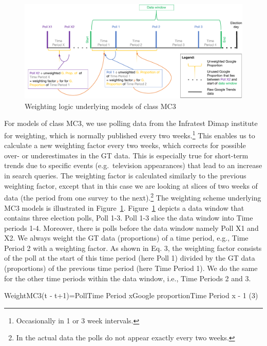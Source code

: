 \documentclass[
  letterpaper,
  DIV=11,
  numbers=noendperiod]{scrartcl}
\begin{document}
\begin{figure}[h]

\caption{\label{fig-3}Weighting logic underlying models of class MC3}

{\centering \includegraphics{Figure_3_weighting_logic.pdf}

}

\end{figure}

For models of class MC3, we use polling data from the Infratest Dimap
institute for weighting, which is normally published every two
weeks.\footnote{Occasionally in 1 or 3 week intervals.} This enables us
to calculate a new weighting factor every two weeks, which corrects for
possible over- or underestimates in the GT data. This is especially true
for short-term trends due to specific events (e.g.~television
appearances) that lead to an increase in search queries. The weighting
factor is calculated similarly to the previous weighting factor, except
that in this case we are looking at slices of two weeks of data (the
period from one survey to the next).\footnote{In the actual data the
  polls do not appear exactly every two weeks.} The weighting scheme
underlying MC3 models is illustrated in Figure~\ref{fig-3}.
Figure~\ref{fig-3} depicts a data window that contains three election
polls, Poll 1-3. Poll 1-3 slice the data window into Time periods 1-4.
Moreover, there is polls before the data window namely Poll X1 and X2.
We always weight the GT data (proportions) of a time period, e.g., Time
Period 2 with a weighting factor. As shown in Eq. 3, the weighting
factor consists of the poll at the start of this time period (here Poll
1) divided by the GT data (proportions) of the previous time period
(here Time Period 1). We do the same for the other time periods within
the data window, i.e., Time Periods 2 and 3.

WeightMC3(t ‐ t+1)=PollTime Period xGoogle proportionTime Period x - 1
(3)
\end{document}
